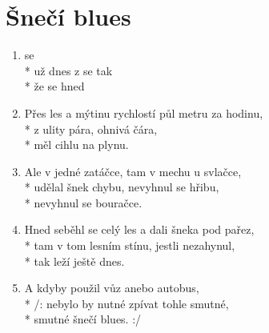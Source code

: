 \section{Šnečí blues}
\begin{enumerate}
\item {}     se   \\*
 už dnes  z  se tak  \\*
že se  hned     
\item Přes les a mýtinu rychlostí půl metru za hodinu, \\*
z ulity pára, ohnivá čára, \\*
měl cihlu na plynu. 
\item Ale v jedné zatáčce, tam v mechu u svlačce, \\*
udělal šnek chybu, nevyhnul se hřibu, \\*
nevyhnul se bouračce.
\item Hned seběhl se celý les a dali šneka pod pařez, \\*
tam v tom lesním stínu, jestli nezahynul, \\*
tak leží ještě dnes.
\item A kdyby použil vůz anebo autobus, \\*
/: nebylo by nutné zpívat tohle smutné, \\*
smutné šnečí blues. :/ 
\end{enumerate}
